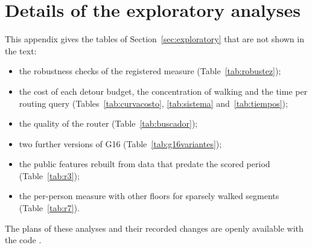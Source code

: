 \documentclass[preprint,12pt,authoryear]{elsarticle}
\newcommand{\ajustar}[1]{\adjustbox{max width=\textwidth}{#1}}
\begin{document}
\section{Details of the exploratory analyses}\label{app:sensibilidad}
This appendix gives the tables of Section~\ref{sec:exploratory} that are not shown in the text:
\begin{itemize}
  \item the robustness checks of the registered measure (Table~\ref{tab:robustez});
  \item the cost of each detour budget, the concentration of walking and the time per routing query (Tables~\ref{tab:curvacosto}, \ref{tab:sistema} and~\ref{tab:tiempos});
  \item the quality of the router (Table~\ref{tab:buscador});
  \item two further versions of G16 (Table~\ref{tab:g16variantes});
  \item the public features rebuilt from data that predate the scored period (Table~\ref{tab:r3});
  \item the per-person measure with other floors for sparsely walked segments (Table~\ref{tab:r7}).
\end{itemize}
The plans of these analyses and their recorded changes are openly available with the code \citep{codigo_zenodo}.

\begin{table}[H]
\centering\small
\caption{Robustness (exploratory). Registered estimate (trip bootstrap); intervals resampling 1-km origin zones, and resampling zones plus Poisson-redrawn crime counts; and the change over all trips (lowest-risk route when offered, fastest otherwise). \%.}
\label{tab:robustez}
\ajustar{}
\end{table}

\begin{table}[H]
\centering\small
\caption{Cost of each detour budget: share of trips for which the router offered a lowest-risk route (Alt.), and median extra walking time of those routes in minutes (Extra min.).}
\label{tab:curvacosto}
\ajustar{}
\end{table}

\begin{table}[H]
\centering\small
\caption{Concentration of walking (descriptive) if every trip followed the fastest route or the app's suggestion (lowest-risk route when offered, otherwise the fastest), with the default limit, over the 2,000 random trips per city. Walked meters are counted per street segment.}
\label{tab:sistema}
\ajustar{}
\end{table}
\end{document}
